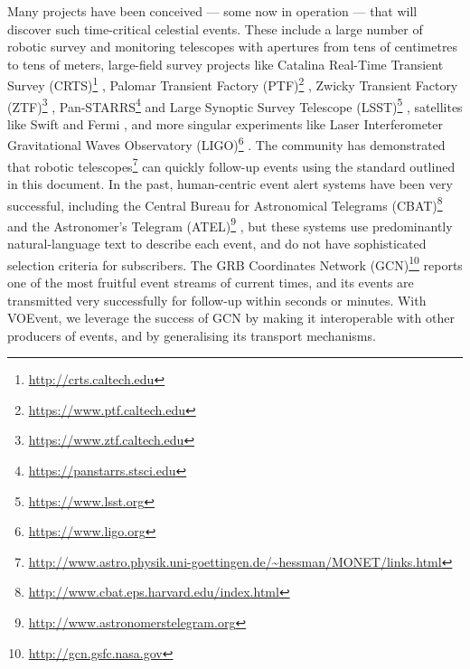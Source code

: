 \documentclass[11pt,a4paper]{ivoa}
\begin{document}
Many projects have been conceived --- some now in operation --- that will
discover such time-critical celestial events. These include a large number of
robotic survey and monitoring telescopes with apertures from tens of centimetres
to tens of meters, large-field survey projects like Catalina Real-Time Transient
Survey (CRTS)\footnote{\url{http://crts.caltech.edu}} \citep{bib08}, Palomar
Transient Factory (PTF)\footnote{\url{https://www.ptf.caltech.edu}} 
\citep{bib31}, Zwicky Transient Factory (ZTF)\footnote{
\url{https://www.ztf.caltech.edu}} \citep{2014htu..conf...27B}, 
Pan-STARRS\footnote{\url{https://panstarrs.stsci.edu}} \citep{bib09} and Large
Synoptic Survey Telescope (LSST)\footnote{\url{https://www.lsst.org}} 
\citep{bib07}, satellites like Swift \citep{bib11a} and Fermi \citep{bib11b},
and more singular experiments like Laser Interferometer Gravitational Waves
Observatory (LIGO)\footnote{\url{https://www.ligo.org}} \citep{bib06}. The
community has demonstrated that robotic telescopes\footnote{
\url{http://www.astro.physik.uni-goettingen.de/~hessman/MONET/links.html}} can
quickly follow-up events using the standard outlined in this document. In the
past, human-centric event alert systems have been very successful, including the
Central Bureau for Astronomical Telegrams (CBAT)\footnote{
\url{http://www.cbat.eps.harvard.edu/index.html}} and the Astronomer's Telegram
(ATEL)\footnote{\url{http://www.astronomerstelegram.org}} \citep{bib01}, but
these systems use predominantly natural-language text to describe each event,
and do not have sophisticated selection criteria for subscribers. The GRB
Coordinates Network (GCN)\footnote{\url{http://gcn.gsfc.nasa.gov}} \citep{bib04}
reports one of the most fruitful event streams of current times, and its events
are transmitted very successfully for follow-up within seconds or minutes. With
VOEvent, we leverage the success of GCN by making it interoperable with other
producers of events, and by generalising its transport mechanisms. 
\end{document}
